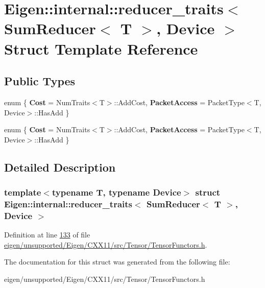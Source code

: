 \hypertarget{struct_eigen_1_1internal_1_1reducer__traits_3_01_sum_reducer_3_01_t_01_4_00_01_device_01_4}{}\section{Eigen\+:\+:internal\+:\+:reducer\+\_\+traits$<$ Sum\+Reducer$<$ T $>$, Device $>$ Struct Template Reference}
\label{struct_eigen_1_1internal_1_1reducer__traits_3_01_sum_reducer_3_01_t_01_4_00_01_device_01_4}
\subsection*{Public Types}
\begin{DoxyCompactItemize}
\item 
\mbox{\label{struct_eigen_1_1internal_1_1reducer__traits_3_01_sum_reducer_3_01_t_01_4_00_01_device_01_4_aace956b5ce0ef66c1f5bc2932e12058b}} 
enum \{ {\bfseries Cost} = Num\+Traits$<$T$>$\+:\+:Add\+Cost, 
{\bfseries Packet\+Access} = Packet\+Type$<$T, Device$>$\+:\+:Has\+Add
 \}
\item 
\mbox{\label{struct_eigen_1_1internal_1_1reducer__traits_3_01_sum_reducer_3_01_t_01_4_00_01_device_01_4_a1cba9bdc7a714b0519fe92eab2676060}} 
enum \{ {\bfseries Cost} = Num\+Traits$<$T$>$\+:\+:Add\+Cost, 
{\bfseries Packet\+Access} = Packet\+Type$<$T, Device$>$\+:\+:Has\+Add
 \}
\end{DoxyCompactItemize}


\subsection{Detailed Description}
\subsubsection*{template$<$typename T, typename Device$>$\newline
struct Eigen\+::internal\+::reducer\+\_\+traits$<$ Sum\+Reducer$<$ T $>$, Device $>$}



Definition at line \hyperlink{eigen_2unsupported_2_eigen_2_c_x_x11_2src_2_tensor_2_tensor_functors_8h_source_l00133}{133} of file \hyperlink{eigen_2unsupported_2_eigen_2_c_x_x11_2src_2_tensor_2_tensor_functors_8h_source}{eigen/unsupported/\+Eigen/\+C\+X\+X11/src/\+Tensor/\+Tensor\+Functors.\+h}.



The documentation for this struct was generated from the following file\+:\begin{DoxyCompactItemize}
\item 
eigen/unsupported/\+Eigen/\+C\+X\+X11/src/\+Tensor/\+Tensor\+Functors.\+h\end{DoxyCompactItemize}
